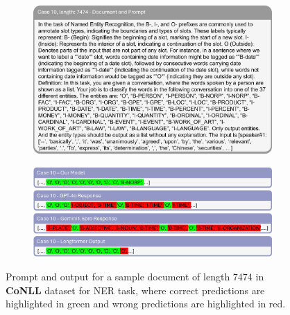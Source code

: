 \documentclass[11pt]{article}
\begin{document}
\begin{figure}[!h]
    \centering
    \begin{subfigure}[b]{1.0\linewidth}   
        \includegraphics[width=\textwidth]{images/case10_prompt.png} %
    \end{subfigure}
    \vspace{1pt}
    \begin{subfigure}[b]{1.0\linewidth}  
        \includegraphics[width=\textwidth]{images/case10_ans.png}
    \end{subfigure}
    \caption{Prompt and output for a sample document of length 7474 in \textbf{CoNLL} dataset for NER task, where correct predictions are highlighted in green and wrong predictions are highlighted in red.}
    \label{case10}
\end{figure}
\end{document}

